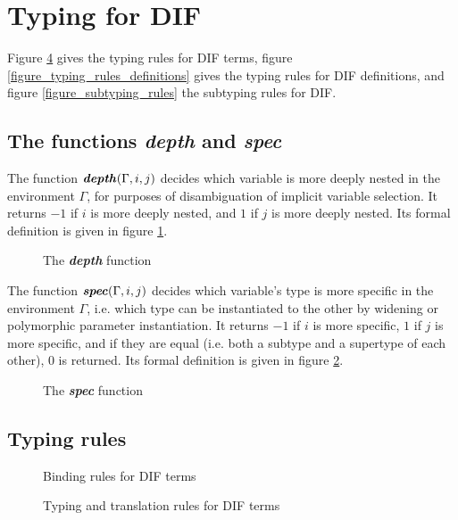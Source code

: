 \section{Typing for DIF}
Figure \ref{figure_typing_rules_terms} gives the typing rules for DIF terms,
figure \ref{figure_typing_rules_definitions} gives the typing rules for DIF
definitions, and figure \ref{figure_subtyping_rules} the subtyping rules for
DIF.

\subsection{The functions \textit{depth} and \textit{spec}}

The function $\textbf{\textit{depth}}(\Gamma, i, j)$ decides which variable is more deeply nested
in the environment $\Gamma$, for purposes of disambiguation of implicit variable
selection. It returns $-1$ if $i$ is more deeply nested, and $1$ if $j$ is more
deeply nested. Its formal definition is given in figure \ref{figure_depth}.

\begin{figure}[h]
    
    \caption{The \textbf{\textit{depth}} function}
    \label{figure_depth}
\end{figure}

The function $\textbf{\textit{spec}}(\Gamma, i, j)$ decides which variable's type is more
specific in the environment $\Gamma$, i.e. which type can be instantiated to the
other by widening or polymorphic parameter instantiation. It returns $-1$ if $i$
is more specific, $1$ if $j$ is more specific, and if they are equal (i.e. both
a subtype and a supertype of each other), 0 is returned. Its formal definition
is given in figure \ref{figure_spec}.

\begin{figure}[h]
    
    \caption{The \textbf{\textit{spec}} function}
    \label{figure_spec}
\end{figure}

\subsection{Typing rules}

\begin{figure}[h]
    
    \caption{Binding rules for DIF terms}
    \label{figure_binding_rules}
\end{figure}

\begin{figure}[h]
    
    \caption{Typing and translation rules for DIF terms}
    \label{figure_typing_rules_terms}
\end{figure}


